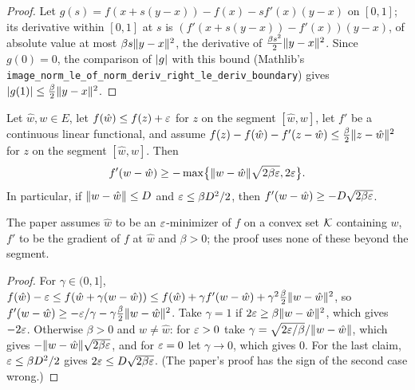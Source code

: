 \begin{proof}
  \leanok
  Let $g(s) = f(x + s(y - x)) - f(x) - s f'(x)(y - x)$ on $[0, 1]$; its derivative within
  $[0, 1]$ at $s$ is $(f'(x + s(y - x)) - f'(x))(y - x)$, of absolute value at most
  $\beta s \lVert y - x \rVert^2$, the derivative of $\frac{\beta s^2}{2}\lVert y - x \rVert^2$. Since
  $g(0) = 0$, the comparison of $\lvert g \rvert$ with this bound (Mathlib's
  \texttt{image\_norm\_le\_of\_norm\_deriv\_right\_le\_deriv\_boundary}) gives
  $\lvert g(1) \rvert \le \frac\beta2 \lVert y - x \rVert^2$.
\end{proof}

\begin{lemma}
  \label{lem:approx_first_order}
  \leanok
  Let $\hat w, w \in E$, let $f(\hat w) \le f(z) + \varepsilon$ for $z$ on the segment $[\hat w, w]$, let
  $f'$ be a continuous linear functional, and assume
  $f(z) - f(\hat w) - f'(z - \hat w) \le \frac\beta2 \lVert z - \hat w \rVert^2$ for $z$ on the segment
  $[\hat w, w]$. Then
  \[ f'(w - \hat w) \ge -\max\bigl\{\lVert w - \hat w \rVert\sqrt{2 \beta \varepsilon}, 2 \varepsilon\bigr\}. \]
  In particular, if $\lVert w - \hat w \rVert \le D$ and $\varepsilon \le \beta D^2/2$, then
  $f'(w - \hat w) \ge -D\sqrt{2\beta\varepsilon}$.

  The paper assumes $\hat w$ to be an $\varepsilon$-minimizer of $f$ on a convex set $\mathcal{K}$ containing
  $w$, $f'$ to be the gradient of $f$ at $\hat w$ and $\beta > 0$; the proof uses none of these
  beyond the segment.
\end{lemma}

\begin{proof}
  \leanok
  For $\gamma \in (0, 1]$, $f(\hat w) - \varepsilon \le f(\hat w + \gamma(w - \hat w)) \le f(\hat w) +
  \gamma f'(w - \hat w) + \gamma^2 \frac\beta2 \lVert w - \hat w \rVert^2$, so
  $f'(w - \hat w) \ge -\varepsilon/\gamma - \gamma\frac\beta2\lVert w - \hat w \rVert^2$. Take $\gamma = 1$ if
  $2\varepsilon \ge \beta\lVert w - \hat w \rVert^2$, which gives $-2\varepsilon$. Otherwise $\beta > 0$ and
  $w \ne \hat w$: for $\varepsilon > 0$ take $\gamma = \sqrt{2\varepsilon/\beta}/\lVert w - \hat w \rVert$, which gives
  $-\lVert w - \hat w \rVert\sqrt{2\beta\varepsilon}$, and for $\varepsilon = 0$ let $\gamma \to 0$, which gives $0$.
  For the last claim, $\varepsilon \le \beta D^2/2$ gives $2\varepsilon \le D\sqrt{2\beta\varepsilon}$. (The paper's
  proof has the sign of the second case wrong.)
\end{proof}
